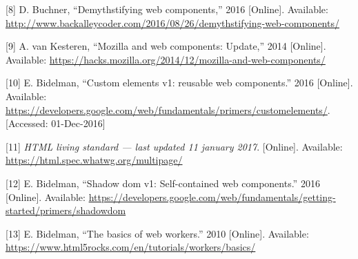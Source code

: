 \documentclass[]{assets/latex/ieee}
\begin{document}
\hypertarget{ref-Buchner2016}{}
{[}8{]} D. Buchner, ``Demythstifying web components,'' 2016
{[}Online{]}. Available:
\url{http://www.backalleycoder.com/2016/08/26/demythstifying-web-components/}

\hypertarget{ref-vanKesteren2014}{}
{[}9{]} A. van Kesteren, ``Mozilla and web components: Update,'' 2014
{[}Online{]}. Available:
\url{https://hacks.mozilla.org/2014/12/mozilla-and-web-components/}

\hypertarget{ref-Bidelman2016}{}
{[}10{]} E. Bidelman, ``Custom elements v1: reusable web components.''
2016 {[}Online{]}. Available:
\url{https://developers.google.com/web/fundamentals/primers/customelements/}.
{[}Accessed: 01-Dec-2016{]}

\hypertarget{ref-HTML}{}
{[}11{]} \emph{HTML living standard --- last updated 11 january 2017}.
{[}Online{]}. Available: \url{https://html.spec.whatwg.org/multipage/}

\hypertarget{ref-Bidelman2016shadow}{}
{[}12{]} E. Bidelman, ``Shadow dom v1: Self-contained web components.''
2016 {[}Online{]}. Available:
\url{https://developers.google.com/web/fundamentals/getting-started/primers/shadowdom}

\hypertarget{ref-Bidelman2010}{}
{[}13{]} E. Bidelman, ``The basics of web workers.'' 2010 {[}Online{]}.
Available: \url{https://www.html5rocks.com/en/tutorials/workers/basics/}
\end{document}
